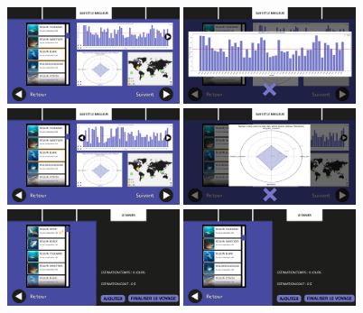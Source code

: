 \documentclass{article}
\begin{document}
\begin{figure}[!h]

	\centering
	\includegraphics[width=0.45\textwidth]{assets/prototype/haute/Diapositive9}
	\hfill
	\includegraphics[width=0.45\textwidth]{assets/prototype/haute/Diapositive10}
	\includegraphics[width=0.45\textwidth]{assets/prototype/haute/Diapositive11}
	\hfill
	\includegraphics[width=0.45\textwidth]{assets/prototype/haute/Diapositive12}
	\includegraphics[width=0.45\textwidth]{assets/prototype/haute/Diapositive13}
	\hfill
	\includegraphics[width=0.45\textwidth]{assets/prototype/haute/Diapositive14}

\end{figure}
\end{document}
